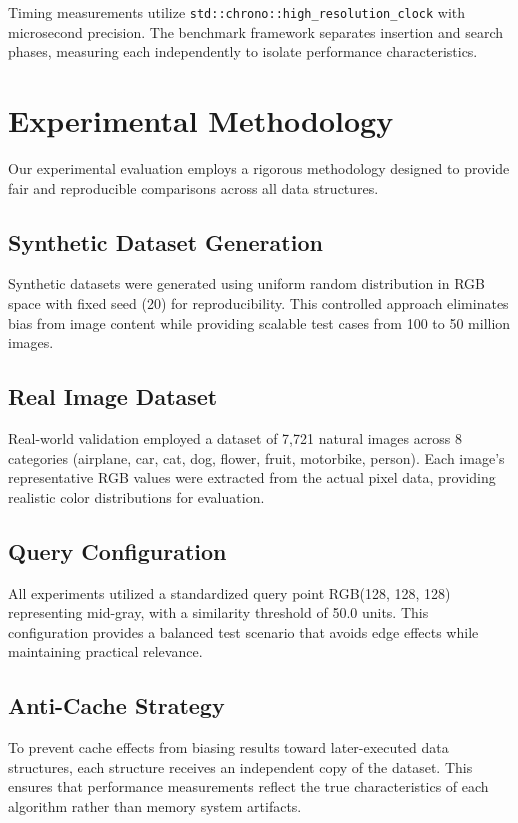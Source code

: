 \documentclass{sbc2023}
\begin{document}
Timing measurements utilize \texttt{std::chrono::high\_resolution\_clock} with microsecond precision. The benchmark framework separates insertion and search phases, measuring each independently to isolate performance characteristics.

\section{Experimental Methodology}
\label{sec:methodology}

Our experimental evaluation employs a rigorous methodology designed to provide fair and reproducible comparisons across all data structures.

\subsection{Synthetic Dataset Generation}

Synthetic datasets were generated using uniform random distribution in RGB space with fixed seed (20) for reproducibility. This controlled approach eliminates bias from image content while providing scalable test cases from 100 to 50 million images.

\subsection{Real Image Dataset}

Real-world validation employed a dataset of 7,721 natural images across 8 categories (airplane, car, cat, dog, flower, fruit, motorbike, person). Each image's representative RGB values were extracted from the actual pixel data, providing realistic color distributions for evaluation.

\subsection{Query Configuration}

All experiments utilized a standardized query point RGB(128, 128, 128) representing mid-gray, with a similarity threshold of 50.0 units. This configuration provides a balanced test scenario that avoids edge effects while maintaining practical relevance.

\subsection{Anti-Cache Strategy}

To prevent cache effects from biasing results toward later-executed data structures, each structure receives an independent copy of the dataset. This ensures that performance measurements reflect the true characteristics of each algorithm rather than memory system artifacts.
\end{document}
